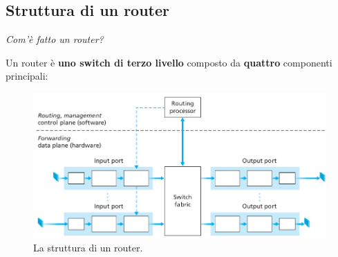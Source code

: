 \documentclass[11pt,a4paper,oneside]{book}
\theoremstyle{definition}
\begin{document}
\pagebreak

\subsection{Struttura di un router}
\begin{flushleft}
	\textit{Com'è fatto un router?}
\end{flushleft}

Un router è \textbf{uno switch di terzo livello} composto da \textbf{quattro} componenti principali:

\begin{figure}[!h]
	\includegraphics[scale=0.5]{Immagini/Router_struc.png}
	\centering
	\caption{La struttura di un router.}
\end{figure}
\end{document}
